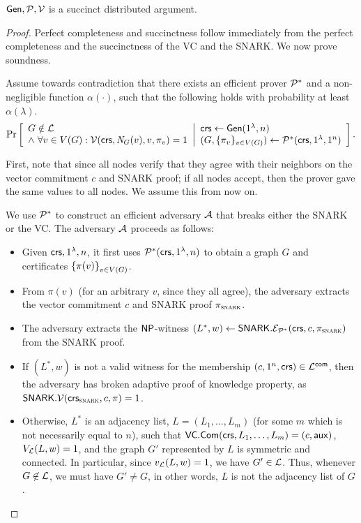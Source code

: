 \begin{claim}
$\mathsf{Gen}, \mathcal{P}, \mathcal{V}$ is a succinct distributed argument.
\end{claim}

\begin{proof}
Perfect completeness and succinctness follow immediately from the perfect completeness and the succinctness of the VC and the SNARK. We now prove soundness.

Assume towards contradiction that there exists an efficient prover $\mathcal{P}^*$ and a non-negligible function $\alpha(\cdot)$, such that the following holds with probability at least $\alpha(\lambda)$.
\begin{gather}\label{eq:soundnessBreakNP}
    \underset{}{\text{Pr}}\left [
    \begin{array}{ll}
    G\notin \mathcal{L} \\
    \wedge\ \forall v\in V(G) : \mathcal{V}(\mathsf{crs}, \mathit{ N }_G(v), v, \pi_{v}) = 1
    \end{array}
    \middle\vert
    \begin{array}{ll}
    \mathsf{crs} \leftarrow \mathsf{Gen}(1^\lambda, n) \\
    (G, \{\pi_{v}\}_{v\in V(G)}) \leftarrow \mathcal{P}^*(\mathsf{crs}, 1^\lambda, 1^n) \\
    \end{array}
    \right ]
    .
\end{gather}

First, note that since all nodes verify that they agree with their neighbors
on the vector commitment $c$ and SNARK proof; if all nodes accept, then the prover gave the same 
values to all nodes. We assume this from now on.

We use $\mathcal{P}^*$ to construct an efficient adversary $\mathcal{A}$ that breaks either the SNARK or the VC.
The adversary $\mathcal{A}$ proceeds as follows: 
\begin{itemize}
	\item Given $\mathsf{crs}, 1^{\lambda}, n$,
		it first uses $\mathcal{P}^*(\mathsf{crs}, 1^{\lambda}, n)$
		to obtain a graph $G$ and certificates $\left \{{ \pi(v) } \right \}_{v \in V(G)}$.
	\item 
		From $\pi(v)$ (for an arbitrary $v$, since they all agree),
		the adversary extracts the vector commitment $c$ and SNARK proof $\pi_\textsc{snark}$.
	\item The adversary extracts the ${\mathsf{NP}}$-witness $(L^*, w) \leftarrow \mathsf{SNARK}.\mathcal{E}_{\mathcal{P}^*}(\mathsf{crs}, c, \pi_\textsc{snark})$
		from the SNARK proof.
	\item If $(L^*, w)$ is not a valid witness for the membership $(c, 1^n, \mathsf{crs}) \in \mathcal{L}^{\mathsf{com}}$,
		then the adversary has broken adaptive proof of knowledge property,
		as $\mathsf{SNARK}.\mathcal{V}(\mathsf{crs}_\textsc{snark}, c, \pi) = 1$.
	\item Otherwise, $L^*$ is an adjacency list, $L = (L_1,\ldots,L_m)$ (for some $m$ which is not necessarily
		equal to $n$), such that $\mathsf{VC}.\mathsf{Com}(\mathsf{crs}, L_1,\ldots, L_m) = (c, \mathsf{aux})$,
		$V_{\mathcal{L}}(L, w) = 1$,
		and the graph $G'$ represented by $L$ is symmetric and connected.
		In particular, since $v_{\mathcal{L}}(L, w) = 1$,
		we have $G' \in \mathcal{L}$.
		Thus, whenever $G \not \in \mathcal{L}$,
		we must have $G' \neq G$, in other words, $L$
		is not the adjacency list of $G$.


\end{itemize}
\end{proof}

